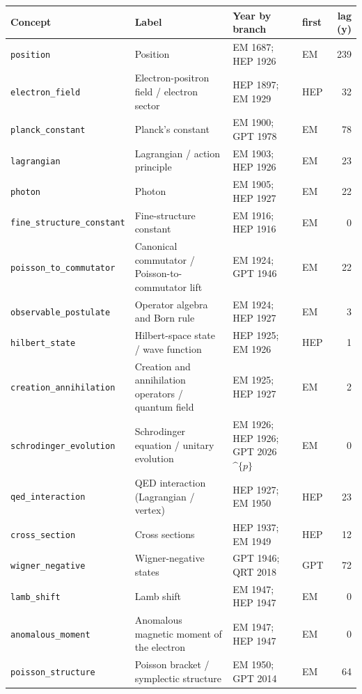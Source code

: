 \begin{longtable}{@{}p{3.1cm}p{3.6cm}p{4.3cm}lr@{}}\toprule
Concept & Label & Year by branch & first & lag (y) \\\midrule\endhead
\texttt{position} & Position & EM 1687; HEP 1926 & EM & 239 \\
\texttt{electron\_\allowbreak{}field} & Electron-positron field / electron sector & HEP 1897; EM 1929 & HEP & 32 \\
\texttt{planck\_\allowbreak{}constant} & Planck's constant & EM 1900; GPT 1978 & EM & 78 \\
\texttt{lagrangian} & Lagrangian / action principle & EM 1903; HEP 1926 & EM & 23 \\
\texttt{photon} & Photon & EM 1905; HEP 1927 & EM & 22 \\
\texttt{fine\_\allowbreak{}structure\_\allowbreak{}constant} & Fine-structure constant & EM 1916; HEP 1916 & EM & 0 \\
\texttt{poisson\_\allowbreak{}to\_\allowbreak{}commutator} & Canonical commutator / Poisson-to-commutator lift & EM 1924; GPT 1946 & EM & 22 \\
\texttt{observable\_\allowbreak{}postulate} & Operator algebra and Born rule & EM 1924; HEP 1927 & EM & 3 \\
\texttt{hilbert\_\allowbreak{}state} & Hilbert-space state / wave function & HEP 1925; EM 1926 & HEP & 1 \\
\texttt{creation\_\allowbreak{}annihilation} & Creation and annihilation operators / quantum field & EM 1925; HEP 1927 & EM & 2 \\
\texttt{schrodinger\_\allowbreak{}evolution} & Schrodinger equation / unitary evolution & EM 1926; HEP 1926; GPT 2026$\^{}\{p\}$ & EM & 0 \\
\texttt{qed\_\allowbreak{}interaction} & QED interaction (Lagrangian / vertex) & HEP 1927; EM 1950 & HEP & 23 \\
\texttt{cross\_\allowbreak{}section} & Cross sections & HEP 1937; EM 1949 & HEP & 12 \\
\texttt{wigner\_\allowbreak{}negative} & Wigner-negative states & GPT 1946; QRT 2018 & GPT & 72 \\
\texttt{lamb\_\allowbreak{}shift} & Lamb shift & EM 1947; HEP 1947 & EM & 0 \\
\texttt{anomalous\_\allowbreak{}moment} & Anomalous magnetic moment of the electron & EM 1947; HEP 1947 & EM & 0 \\
\texttt{poisson\_\allowbreak{}structure} & Poisson bracket / symplectic structure & EM 1950; GPT 2014 & EM & 64 \\

\end{longtable}
